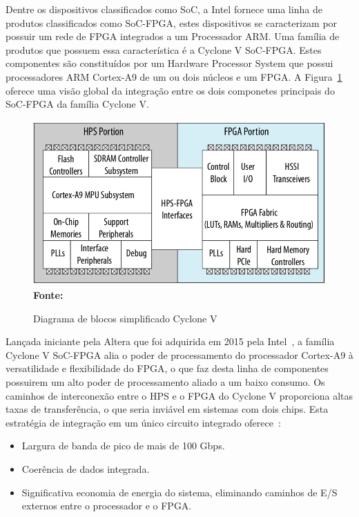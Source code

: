 
Dentre os dispositivos classificados como SoC, a Intel fornece uma linha de produtos classificados como SoC-FPGA, estes dispositivos se caracterizam por possuir um rede de FPGA integrados a um Processador ARM\@. Uma família de produtos que possuem essa característica é a Cyclone V SoC-FPGA\@. Estes componentes são constituídos por um Hardware Processor System que possui processadores ARM Cortex-A9 de um ou dois núcleos e um FPGA\@. A Figura~\ref{fig:socfpga} oferece uma visão global da integração entre os dois componetes principais do SoC-FPGA da família Cyclone V. 

\begin{figure}[ht]
	\caption{Diagrama de blocos simplificado Cyclone V}
	\begin{center}
		\includegraphics[scale=0.46]{imagens/socfpga.png}\\
		{\small \textbf{Fonte:} }
    \end{center}\label{fig:socfpga}
\end{figure}

Lançada iniciante pela Altera que foi adquirida em 2015 pela Intel~\cite{intelbuyaltera}, a família Cyclone V SoC-FPGA alia o poder de processamento do processador Cortex-A9 à versatilidade e flexibilidade do FPGA, o que faz desta linha de componentes possuirem um alto poder de processamento aliado a um baixo consumo. Os caminhos de interconexão entre o HPS e o FPGA do Cyclone V proporciona altas taxas de transferência, o que seria inviável em sistemas com dois chips. Esta estratégia de integração em um único circuito integrado oferece~\cite{CycloneV}:

\begin{itemize}
    \item Largura de banda de pico de mais de 100 Gbps.
    \item Coerência de dados integrada.
    \item Significativa economia de energia do sistema, eliminando caminhos de E/S externos entre o processador e o FPGA\@.
\end{itemize}


